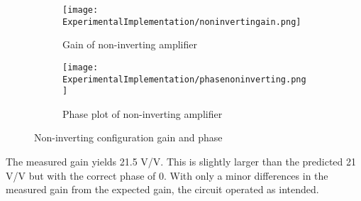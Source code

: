 		
		
						\begin{figure}[H]
			\centering
			\begin{subfigure}[b]{0.45\textwidth}
				\centering
				\texttt{[image: ExperimentalImplementation/noninvertingain.png]}
\caption{Gain of non-inverting amplifier}
\label{fig:gainnoninverting1}
			\end{subfigure}
			\hfill
			\begin{subfigure}[b]{0.45\textwidth}
				\centering
			\texttt{[image: ExperimentalImplementation/phasenoninverting.png]}
\caption{Phase plot of non-inverting amplifier}
\label{fig:phasenoninverting}
			\end{subfigure}
			\caption{Non-inverting configuration gain and phase}
			\label{fig:gainnoninverting}
		\end{figure} 
		
The measured gain yields 21.5 V/V.  This is slightly larger than the predicted 21 V/V but with the correct phase of 0. With only a minor differences in the measured gain from the expected gain, the circuit operated as intended.



	
	